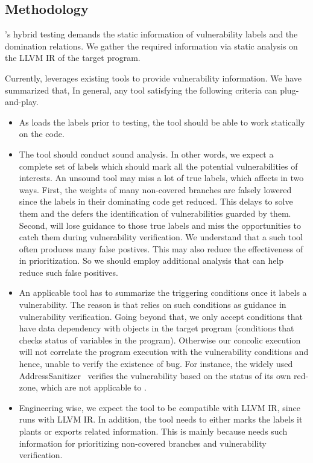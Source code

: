 \subsection{Methodology}
\label{savior:sec:methodology}

\savior's hybrid testing demands the static information of vulnerability 
labels and the domination relations. We gather the 
required information via static analysis on the LLVM IR of the target 
program. 

Currently, \savior leverages existing tools to provide vulnerability information. We have summarized that,
In general, any tool satisfying the following criteria can plug-and-play. 

\begin{itemize}
\item As \savior loads the labels prior to testing, the tool should 
be able to work statically on the code.

\item The tool should conduct sound analysis. In other words, 
we expect a complete set of labels which should mark all the potential 
vulnerabilities of interests. 
%
An unsound tool may miss a lot of true labels, which affects \savior 
in two ways. First, the weights of many non-covered branches are 
falsely lowered since the labels in their dominating code get reduced. 
This delays \savior to solve them and the defers the identification 
of vulnerabilities guarded by them. Second, \savior will lose guidance 
to those true labels and miss the opportunities to catch them 
during vulnerability verification. We understand that a such 
tool often produces many false postives. This may also 
reduce the effectiveness of \savior in prioritization. 
So we should employ additional analysis that can help reduce such false positives. 

\item An applicable tool has to summarize the triggering 
conditions once it labels a vulnerability.
The reason is that \savior relies on such conditions 
as guidance in vulnerability verification. Going beyond that, 
we only accept conditions that have data dependency with 
objects in the target program (\eg conditions that checks status of 
variables in the program). Otherwise our concolic execution will 
not correlate the program execution with the vulnerability conditions 
and hence, unable to verify the existence of bug. 
For instance, the widely used AddressSanitizer~\cite{serebryany2012addresssanitizer} 
verifies the vulnerability based on the status of its own red-zone,  
which are not applicable to \savior.

\item Engineering wise, we expect the tool to be compatible with LLVM IR, since 
\savior runs with LLVM IR. In addition, the tool needs to either marks the labels 
it plants or exports related information. This is mainly because \savior needs 
such information for prioritizing non-covered branches and 
vulnerability verification.  
\end{itemize}

